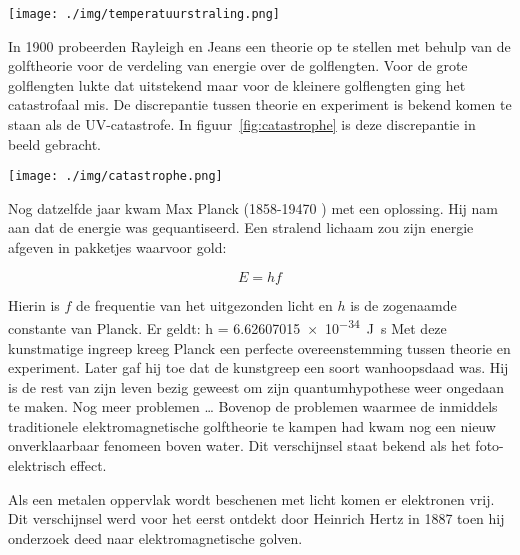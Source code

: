 {\begin{center}
\leavevmode
\texttt{[image: ./img/temperatuurstraling.png]}
\end{center}

In 1900 probeerden Rayleigh en Jeans een theorie op te stellen met behulp van de golftheorie voor de verdeling van energie over de golflengten. Voor de grote golflengten lukte dat uitstekend maar voor de kleinere golflengten ging het catastrofaal mis. De discrepantie tussen theorie en experiment is bekend komen te staan als de UV-catastrofe.
In figuur~\ref{fig:catastrophe} is deze discrepantie in beeld gebracht.

\begin{center}
\leavevmode
\texttt{[image: ./img/catastrophe.png]}
\end{center}

Nog datzelfde jaar kwam Max Planck (1858-19470 ) met een oplossing. Hij nam aan dat de energie was gequantiseerd. Een stralend lichaam zou zijn energie afgeven in pakketjes waarvoor gold:

$$E=hf$$

Hierin is $f$ de frequentie van het uitgezonden licht en $h$ is de zogenaamde constante van Planck. Er geldt: h = \SI{6.62607015e-34}{\joule\second}
Met deze kunstmatige ingreep kreeg Planck een perfecte overeenstemming tussen theorie en experiment. Later gaf hij toe dat de kunstgreep een soort wanhoopsdaad was. Hij is de rest van zijn leven bezig geweest om zijn quantumhypothese weer ongedaan te maken.
Nog meer problemen \ldots
Bovenop de problemen waarmee de inmiddels traditionele elektromagnetische golftheorie te kampen had kwam nog een nieuw onverklaarbaar fenomeen boven water. Dit verschijnsel staat bekend als het foto-elektrisch effect.

Als een metalen oppervlak wordt beschenen met licht komen er elektronen vrij. Dit verschijnsel werd voor het eerst ontdekt door Heinrich Hertz in 1887 toen hij onderzoek deed naar elektromagnetische golven. 

}
